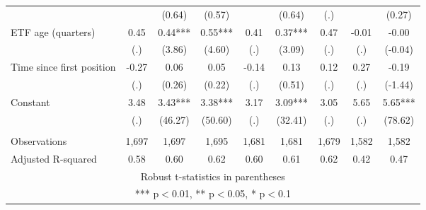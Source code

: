 \documentclass[]{article}
\begin{document}
\begin{tabular}{lcccccccc}
 &  & (0.64) & (0.57) &  & (0.64) & (.) &  & (0.27) \\
ETF age (quarters) & 0.45 & 0.44*** & 0.55*** & 0.41 & 0.37*** & 0.47 & -0.01 & -0.00 \\
 & (.) & (3.86) & (4.60) & (.) & (3.09) & (.) & (.) & (-0.04) \\
Time since first position & -0.27 & 0.06 & 0.05 & -0.14 & 0.13 & 0.12 & 0.27 & -0.19 \\
 & (.) & (0.26) & (0.22) & (.) & (0.51) & (.) & (.) & (-1.44) \\
Constant & 3.48 & 3.43*** & 3.38*** & 3.17 & 3.09*** & 3.05 & 5.65 & 5.65*** \\
 & (.) & (46.27) & (50.60) & (.) & (32.41) & (.) & (.) & (78.62) \\
 &  &  &  &  &  &  &  &  \\
Observations & 1,697 & 1,697 & 1,695 & 1,681 & 1,681 & 1,679 & 1,582 & 1,582 \\
 Adjusted R-squared & 0.58 & 0.60 & 0.62 & 0.60 & 0.61 & 0.62 & 0.42 & 0.47 \\ \hline
\multicolumn{9}{c}{ Robust t-statistics in parentheses} \\
\multicolumn{9}{c}{ *** p$<$0.01, ** p$<$0.05, * p$<$0.1} \\
\end{tabular}
\end{document}
